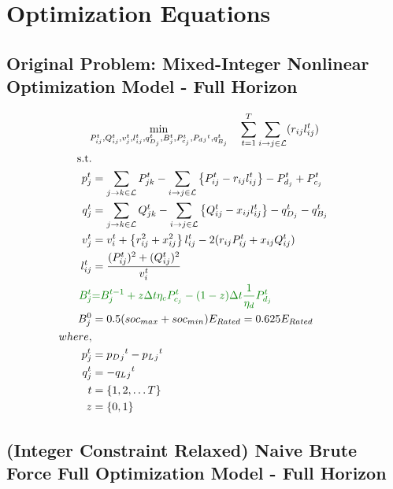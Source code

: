 \section*{Optimization Equations}

\subsection*{Original Problem: Mixed-Integer Nonlinear Optimization Model - Full Horizon}

\begin{gather}
    \min_{P_{ij}^t, Q_{ij}^t, v_{j}^t, l_{ij}^t, q_{D_j}^t, B_{j}^{t},
	P_{c_j}^t, P_d{_j}^t, q_{B_j}^t} \quad
	\sum_{t = 1}^{T} \sum_{\fromto{i, j} \in \mathcal{L}} (r_{ij}l_{ij}^t) \\
	\begin{align}
		\text{s.t.} & {}\nonumber \\
		{p_j^t} & = {\sum_{\fromto{j,k} \in \mathcal{L}} P_{jk}^t - \sum_{\fromto{i,j} \in \mathcal{L}}\left\{P_{ij}^t - r_{ij}l_{ij}^t\right\} - P_{d_j}^t + P_{c_j}^t} && \\
		{q_j^t} & = {\sum_{\fromto{j,k} \in \mathcal{L}} Q_{jk}^t - \sum_{\fromto{i,j} \in \mathcal{L}}\left\{Q_{ij}^t - x_{ij}l_{ij}^t\right\} - q_{D_j}^t - q_{B_j}^t} && \\
		{v_j^t} & = {v_{i}^t +  \left\{r_{ij}^2 + x_{ij}^2\right\}l_{ij}^t - 2(r_{ij}P_{ij}^t + x_{ij}Q_{ij}^t)} && \\
		{l_{ij}^t} & = {\frac{(P_{ij}^{t})^2 + (Q_{ij}^{t})^2}{v_i^t}} \\
		{\color{darkgreen}{ B_{j}^{t} }} &\color{darkgreen}{=} { \color{darkgreen}{ B_{j}^{t-1} + z \Delta t  \eta_c P_{c_j}^t - (1-z) \Delta t\frac{1}{\eta_d} P_{d_j}^t } } \\
		{ B_{j}^{0} } &= { 0.5(soc_{max}+soc_{min})E_{Rated} = 0.625E_{Rated}} \\
		{where,} & {} \\
		{p_j^t} &= {p_D{_j}^t - p_L{_j}^t} \\
		{q_j^t} &= {-q_L{_j}^t} \\
		{t} &= {\{1, 2, \ldots T\}} \\
		{z} &= {\{0, 1\}}
	\end{align}
\end{gather}

\subsection*{(Integer Constraint Relaxed) Naive Brute Force Full Optimization Model - Full Horizon}

